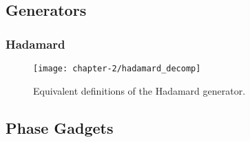 \subsection{Generators}

\subsubsection{Hadamard}%
\label{hadamard}

\begin{figure}[H]
\centering
    \centering
    \texttt{[image: chapter-2/hadamard\_decomp]}
    \caption{Equivalent definitions of the Hadamard generator.}
\end{figure}


\subsection{Phase Gadgets}
%
\label{phase_gadget_fusion_steps}


